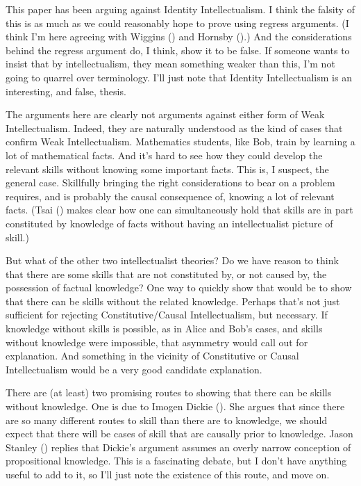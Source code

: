 \documentclass[
  11pt,
  letterpaper,
  DIV=11,
  numbers=noendperiod,
  oneside]{scrartcl}
\begin{document}
This paper has been arguing against Identity Intellectualism. I think
the falsity of this is as much as we could reasonably hope to prove
using regress arguments. (I think I'm here agreeing with Wiggins
() and Hornsby
().) And the considerations behind the
regress argument do, I think, show it to be false. If someone wants to
insist that by intellectualism, they mean something weaker than this,
I'm not going to quarrel over terminology. I'll just note that Identity
Intellectualism is an interesting, and false, thesis.

The arguments here are clearly not arguments against either form of Weak
Intellectualism. Indeed, they are naturally understood as the kind of
cases that confirm Weak Intellectualism. Mathematics students, like Bob,
train by learning a lot of mathematical facts. And it's hard to see how
they could develop the relevant skills without knowing some important
facts. This is, I suspect, the general case. Skillfully bringing the
right considerations to bear on a problem requires, and is probably the
causal consequence of, knowing a lot of relevant facts. (Tsai
() makes clear how one can simultaneously
hold that skills are in part constituted by knowledge of facts without
having an intellectualist picture of skill.)

But what of the other two intellectualist theories? Do we have reason to
think that there are some skills that are not constituted by, or not
caused by, the possession of factual knowledge? One way to quickly show
that would be to show that there can be skills without the related
knowledge. Perhaps that's not just sufficient for rejecting
Constitutive/Causal Intellectualism, but necessary. If knowledge without
skills is possible, as in Alice and Bob's cases, and skills without
knowledge were impossible, that asymmetry would call out for
explanation. And something in the vicinity of Constitutive or Causal
Intellectualism would be a very good candidate explanation.

There are (at least) two promising routes to showing that there can be
skills without knowledge. One is due to Imogen Dickie
(). She argues that since there are so
many different routes to skill than there are to knowledge, we should
expect that there will be cases of skill that are causally prior to
knowledge. Jason Stanley ()
replies that Dickie's argument assumes an overly narrow conception of
propositional knowledge. This is a fascinating debate, but I don't have
anything useful to add to it, so I'll just note the existence of this
route, and move on.
\end{document}
